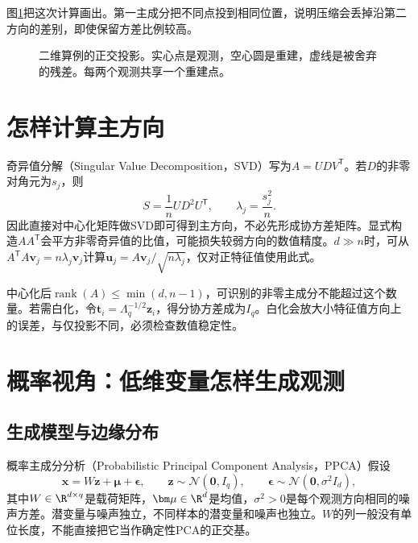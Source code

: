 图\ref{fig:pca-projection-example}把这次计算画出。第一主成分把不同点投到相同位置，说明压缩会丢掉沿第二方向的差别，即使保留方差比例较高。
\begin{figure}[htbp]
\centering
{}
\caption{二维算例的正交投影。实心点是观测，空心圆是重建，虚线是被舍弃的残差。每两个观测共享一个重建点。}
\label{fig:pca-projection-example}
\end{figure}

\section{怎样计算主方向}
奇异值分解（Singular Value Decomposition，SVD）写为$A=UDV^{\mathsf T}$。若$D$的非零对角元为$s_j$，则
\begin{equation}
 S=\frac1nUD^2U^{\mathsf T},\qquad\lambda_j=\frac{s_j^2}{n}.
\end{equation}
因此直接对中心化矩阵做SVD即可得到主方向，不必先形成协方差矩阵。显式构造$AA^{\mathsf T}$会平方非零奇异值的比值，可能损失较弱方向的数值精度。$d\gg n$时，可从$A^{\mathsf T}A\bm v_j=n\lambda_j\bm v_j$计算$\bm u_j=A\bm v_j/\sqrt{n\lambda_j}$，仅对正特征值使用此式。

中心化后$\operatorname{rank}(A)\le\min(d,n-1)$，可识别的非零主成分不能超过这个数量。若需白化，令$\bm t_i=\Lambda_q^{-1/2}\bm z_i$，得分协方差成为$I_q$。白化会放大小特征值方向上的误差，与仅投影不同，必须检查数值稳定性。

\section{概率视角：低维变量怎样生成观测}
\subsection{生成模型与边缘分布}
概率主成分分析（Probabilistic Principal Component Analysis，PPCA）假设
\begin{equation}
 \bm x=W\bm z+\bm\mu+\bm\epsilon,\qquad
 \bm z\sim\mathcal N(\bm0,I_q),\qquad
 \bm\epsilon\sim\mathcal N(\bm0,\sigma^2I_d),
 \label{eq:ppca-generative-model}
\end{equation}
其中$W\in\R^{d\times q}$是载荷矩阵，$\bm\mu\in\R^d$是均值，$\sigma^2>0$是每个观测方向相同的噪声方差。潜变量与噪声独立，不同样本的潜变量和噪声也独立。$W$的列一般没有单位长度，不能直接把它当作确定性PCA的正交基。

